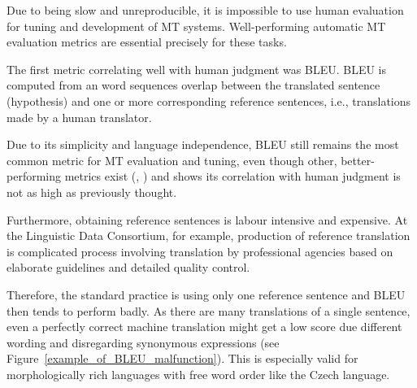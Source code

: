 \documentclass[11pt]{article}
\def\Fref#1{Figure~\ref{#1}}
\begin{document}
Due to being slow and unreproducible, it is impossible to use human evaluation
for tuning and development of MT systems. Well-performing automatic MT 
evaluation metrics are essential precisely for these tasks.



The first metric correlating well with human judgment was BLEU. \cite{bleu}
BLEU is computed from an word sequences overlap between the translated sentence 
(hypothesis) and one or more corresponding reference sentences, i.e., 
translations made by a human translator.

Due to its simplicity and language independence, BLEU still remains the most 
common metric for MT evaluation and tuning, even though other, 
better-performing metrics exist (\cite{wmt13-metrics}, \cite{wmt14}) and 
\cite{callison2006re} shows its correlation with human judgment is not as high 
as previously thought.


Furthermore, obtaining reference sentences is labour intensive and expensive.
At the Linguistic Data Consortium, for example, production of reference 
translation is complicated process involving translation by professional 
agencies based on elaborate guidelines and detailed quality control. 
\cite{strassel} 


Therefore, the standard practice is using only one reference sentence and BLEU 
then tends to perform badly. As there are many translations of a single 
sentence, even a perfectly correct machine translation might get a low score 
due different wording and disregarding synonymous expressions (see 
\Fref{example_of_BLEU_malfunction}). This is especially valid for morphologically 
rich languages with free word order like the Czech language. 
\cite{bojar-tackling-sparse-data}
\end{document}
